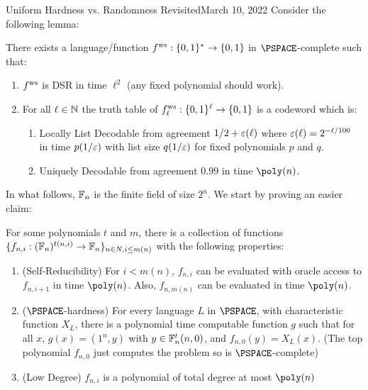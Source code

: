 \begin{lecture}{8}{Uniform Hardness vs. Randomness Revisited}{March 10, 2022}
Consider the following lemma:
\begin{lemma}\label{lem:DSR-ECC-func}
	There exists a language/function $ f^{\text{ws}}  :\{0,1\}^* \rightarrow \{0,1\}$ in $\PSPACE$-complete such that:
	\begin{enumerate}
		\item $ f^{\text{ws}} $ is DSR in time ${\ell}^2$ (any fixed polynomial should work).
		\item For all $\ell \in \mathbb{N}$ the truth table of $ f^{\text{ws}} _{\ell} : \{0,1\}^\ell \rightarrow \{0,1\}$ is a codeword
		which is:
		\begin{enumerate}
			\item Locally List Decodable from agreement $1/2 + \varepsilon(\ell)$ where $\varepsilon(\ell) = 2^{-\ell /
				100}$ in time $p(1/\varepsilon)$ with list size $q(1 / \varepsilon)$ for fixed polynomials $p$ and $q$.
			\item Uniquely Decodable from agreement $0.99$ in time $\poly(n)$.
		\end{enumerate}
	\end{enumerate}
\end{lemma}

In what follows, $\mathbb{F}_n$ is the finite field of size $2^n$. We start by proving an easier claim:
\begin{claim}\label{clm:USR-func-fam}
	For some polynomials $t$ and $m$, there is a collection of functions \\ $\{f_{n,i} : (\mathbb{F}_n)^{t(n,i)} \rightarrow \mathbb{F}_n\}_{n \in N,i \leq m(n)}$ with the following properties:
	\begin{enumerate}
		\item (Self-Reducibility) For $i < m(n)$, $f_{n,i}$ can be evaluated with oracle access	to $f_{n,i+1}$ in time $\poly(n)$. Also, $f_{n,m(n)}$ can be evaluated in time $\poly(n)$.
		\item ($\PSPACE$-hardness)  For every language $L$ in $\PSPACE$, with characteristic function $X_L$, there is a polynomial time computable function $g$ such that for all $x$, $g(x) = (1^n, y)$ with $y \in \mathbb{F}_n^t(n,0)$, and $f_{n,0}(y) = X_L(x)$. (The top polynomial $f_{n,0}$ just computes the problem so is $\PSPACE$-complete)
		\item (Low Degree) $f_{n,i}$ is a polynomial of total degree at most $\poly(n)$
	\end{enumerate}
\end{claim}


\end{lecture}

